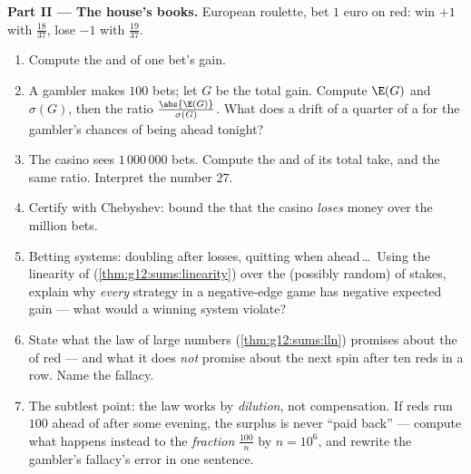 \begin{problem}
\medskip
\noindent\textbf{Part II --- The house's books.}
European roulette, bet $1$ euro on red: win $+1$ with
 $\frac{18}{37}$, lose $-1$ with 
$\frac{19}{37}$.
\begin{enumerate}[resume]
  \item Compute the  and  of one
        bet's gain.
  \item A gambler makes $100$  bets; let $G$ be the
        total gain. Compute $\E(G)$ and $\sigma(G)$, then the
        ratio $\frac{\abs{\E(G)}}{\sigma(G)}$. What does a
        drift of a quarter of a   for the
        gambler's chances of being ahead tonight?
  \item The casino sees $1\,000\,000$ bets. Compute the
         and  of its total take,
        and the same ratio. Interpret the number $27$.
  \item Certify with Chebyshev: bound the  that the
        casino \emph{loses} money over the million bets.
  \item Betting systems: doubling after losses, quitting when
        ahead\,\dots\ Using the linearity of 
        (\cref{thm:g12:sums:linearity}) over the (possibly
        random)  of stakes, explain why \emph{every}
        strategy in a negative-edge game has negative expected
        gain --- what would a winning system violate?
  \item State what the law of large numbers
        (\cref{thm:g12:sums:lln}) promises about the 
        of red --- and what it does \emph{not} promise about
        the next spin after ten reds in a row. Name the
        fallacy.
  \item The subtlest point: the law works by \emph{dilution},
        not compensation. If reds run $100$ ahead of
         after some evening, the surplus is never
        ``paid back'' --- compute what happens instead to the
        \emph{fraction} $\frac{100}{n}$ by $n = 10^6$, and
        rewrite the gambler's fallacy's error in one sentence.
\end{enumerate}


\end{problem}
